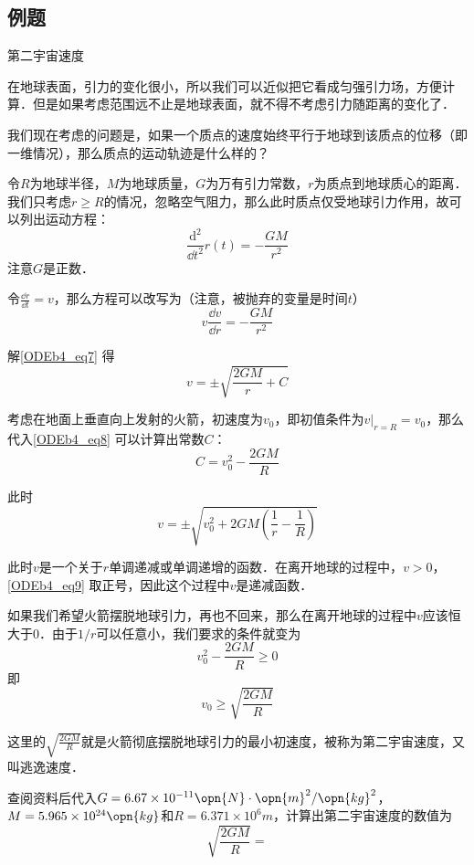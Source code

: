 \subsection{例题}

\begin{example}{第二宇宙速度}

在地球表面，引力的变化很小，所以我们可以近似把它看成匀强引力场，方便计算．但是如果考虑范围远不止是地球表面，就不得不考虑引力随距离的变化了．

我们现在考虑的问题是，如果一个质点的速度始终平行于地球到该质点的位移（即一维情况），那么质点的运动轨迹是什么样的？

令$R$为地球半径，$M$为地球质量，$G$为万有引力常数，$r$为质点到地球质心的距离．我们只考虑$r\geq R$的情况，忽略空气阻力，那么此时质点仅受地球引力作用，故可以列出运动方程：
\begin{equation}
\frac{\mathrm{d}^2}{\dd t^2}r(t)=-\frac{GM}{r^2}
\end{equation}
注意$G$是正数．

令$\frac{\dd r}{\dd t}=v$，那么方程可以改写为（注意，被抛弃的变量是时间$t$）
\begin{equation}\label{ODEb4_eq7}
v\frac{\dd v}{\dd r}=-\frac{GM}{r^2}
\end{equation}

解\autoref{ODEb4_eq7} 得
\begin{equation}\label{ODEb4_eq8}
v=\pm\sqrt{\frac{2GM}{r}+C}
\end{equation}

考虑在地面上垂直向上发射的火箭，初速度为$v_0$，即初值条件为$v|_{r=R}=v_0$，那么代入\autoref{ODEb4_eq8} 可以计算出常数$C$：
\begin{equation}
C=v_0^2-\frac{2GM}{R}
\end{equation}

此时
\begin{equation}\label{ODEb4_eq9}
v=\pm\sqrt{v_0^2+2GM(\frac{1}{r}-\frac{1}{R})}
\end{equation}

此时$v$是一个关于$r$单调递减或单调递增的函数．在离开地球的过程中，$v>0$，\autoref{ODEb4_eq9} 取正号，因此这个过程中$v$是递减函数．

如果我们希望火箭摆脱地球引力，再也不回来，那么在离开地球的过程中$v$应该恒大于$0$．由于$1/r$可以任意小，我们要求的条件就变为
\begin{equation}
v_0^2-\frac{2GM}{R}\geq 0
\end{equation}
即
\begin{equation}
v_0\geq\sqrt{\frac{2GM}{R}}
\end{equation}

这里的$\sqrt{\frac{2GM}{R}}$就是火箭彻底摆脱地球引力的最小初速度，被称为第二宇宙速度，又叫逃逸速度．

查阅资料后代入$G=6.67\times10^{-11} \opn{N}\cdot\opn{m}^2/\opn{kg}^2$，$M=5.965\times10^{24}\opn{kg}$和$R=6.371\times10^{6}m$，计算出第二宇宙速度的数值为
\begin{equation}
\sqrt{\frac{2GM}{R}}=
\end{equation}



\end{example}
















